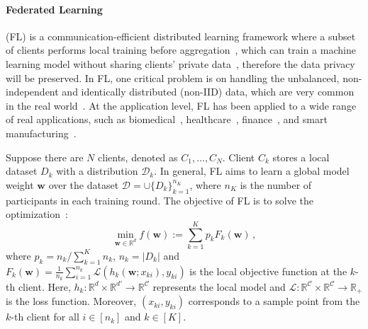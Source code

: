 \documentclass{article} %
\newcommand{\D}{\mathcal{D}}
\newcommand{\w}{\boldsymbol{w}}
\newcommand{\R}[1]{\mathbb{R}^{#1}}
\begin{document}
\paragraph{Federated Learning}(FL) is a communication-efficient distributed learning framework where a subset of clients performs local training before aggregation~\citep{KonecnyMRR16, mcmahan2017communication}, which can train a machine learning model without sharing clients' private data~\citep{bonawitz2017practical}, therefore the data privacy will be preserved. In FL, one critical problem is on handling the unbalanced, non-independent and identically distributed (non-IID) data, which are very common in the real world~\citep{zhao2018federated,sattler2019robust,li2019convergence}.
At the application level, FL has been applied to a wide range of real applications, such as  biomedical~\citep{brisimi2018federated}, healthcare~\citep{xu2021federated}, finance~\citep{yang2019ffd}, and smart manufacturing~\citep{hao2019efficient}.

Suppose there are $N$ clients, denoted as $C_1,\ldots,C_N$. Client $C_k$ stores a local dataset $D_k$ with a distribution $\D_k$. In general, FL aims to learn a global model weight $\w$ over the dataset $\mathcal{D} = \cup \{D_k\}_{k=1}^{n_K}$, where $n_K$ is the number of participants in each training round. The objective of FL is to solve the optimization~\citep{mcmahan2017communication}:
\begin{equation}
  \min_{\w \in \R{d}} f(\w) := \sum^{K}_{k=1} p_k F_k(\w)\,, \label{eq:fl}
\end{equation}
where $p_k=n_k/\sum_{k=1}^Kn_k$, $n_k=|D_k|$ and $F_k(\w)=\frac{1}{n_k}\sum_{i=1}^{n_k}\mathcal{L}(h_k(\w;x_{ki}),y_{ki})$ is the local objective function at the $k$-th client. Here, $h_k:\R{d}\times \R{d'}\to \R{\mathcal{C}}$ represents the local model and $\mathcal{L}: \R{\mathcal{C}}\times \R{\mathcal{C}} \to \R{}_{+}$ is the loss function. Moreover, $(x_{ki}, y_{ki})$ corresponds to a sample point from the $k$-th client for all $i\in[n_k]$ and $k\in[K]$.
\end{document}
